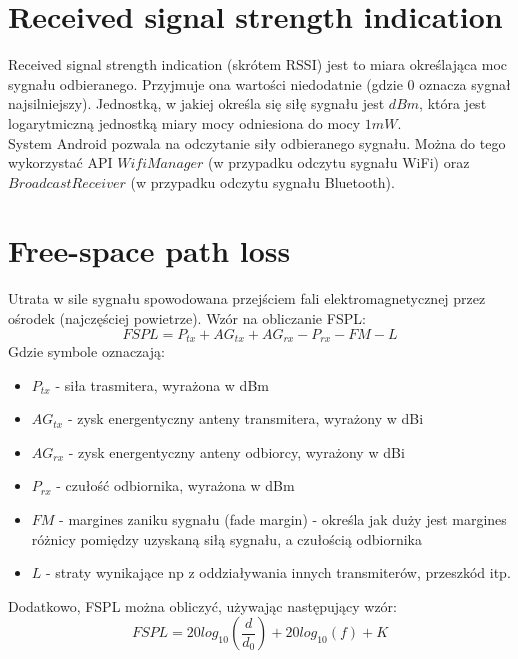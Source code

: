\section{Received signal strength indication}
Received signal strength indication (skrótem RSSI) jest to miara określająca moc sygnału odbieranego. Przyjmuje ona wartości niedodatnie (gdzie 0 oznacza sygnał najsilniejszy). Jednostką, w jakiej określa się siłę sygnału jest $dBm$, która jest logarytmiczną jednostką miary mocy odniesiona do mocy $1mW$.\\
System Android pozwala na odczytanie siły odbieranego sygnału. Można do tego wykorzystać API $WifiManager$ (w przypadku odczytu sygnału WiFi) oraz $BroadcastReceiver$ (w przypadku odczytu sygnału Bluetooth).
\section{Free-space path loss}		  		  
Utrata w sile sygnału spowodowana przejściem fali elektromagnetycznej przez ośrodek (najczęściej powietrze).
Wzór na obliczanie FSPL:
\begin{equation}
FSPL = P_{tx} + AG_{tx} + AG_{rx} - P_{rx} - FM - L
\end{equation}
Gdzie symbole oznaczają:
\begin{itemize}
	\item $P_{tx}$ - siła trasmitera, wyrażona w dBm
	\item $AG_{tx}$ - zysk energentyczny anteny transmitera, wyrażony w dBi
	\item $AG_{rx}$ - zysk energentyczny anteny odbiorcy, wyrażony w dBi
	\item $P_{rx}$ - czułość odbiornika, wyrażona w dBm
	\item $FM$ - margines zaniku sygnału (fade margin) - określa jak duży jest margines różnicy pomiędzy uzyskaną siłą sygnału, a czułością odbiornika
	\item $L$ - straty wynikające np z oddziaływania innych transmiterów, przeszkód itp.
\end{itemize}
Dodatkowo, FSPL można obliczyć, używając następujący wzór:
\begin{equation}
FSPL = 20log_{10}\left(\frac{d}{d_{0}}\right) + 20log_{10}(f) + K
\end{equation}
